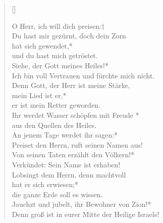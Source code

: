 \begin{verse}[\versewidth]
 
O Herr, ich will dich preisen:†\\
Du hast mir gezürnt, doch dein Zorn\\ hat sich gewendet,*\\
und du hast mich getröstet.\\
\vin Siehe, der Gott meines Heiles!*\\
\vin Ich bin voll Vertrauen und fürchte mich nicht.\\
Denn Gott, der Herr ist meine Stärke,\\
mein Lied ist er,*\\
er ist mein Retter geworden.\\

\vin Ihr werdet Wasser schöpfen mit Freude *\\
\vin aus den Quellen des Heiles.\\

An jenem Tage werdet ihr sagen:*\\
Preiset den Herrn, ruft seinen Namen aus!\\

\vin Von seinen Taten erzählt den Völkern!*\\
\vin Verkündet: Sein Name ist erhaben!\\

Lobsingt dem Herrn, denn machtvoll \\ hat er sich erwiesen;*\\
die ganze Erde soll es wissen.\\

\vin Jauchzt und jubelt, ihr Bewohner von Zion!*\\
\vin Denn groß ist in eurer Mitte der Heilige Israels!\\
\end{verse}

\vspace{0.6cm}


